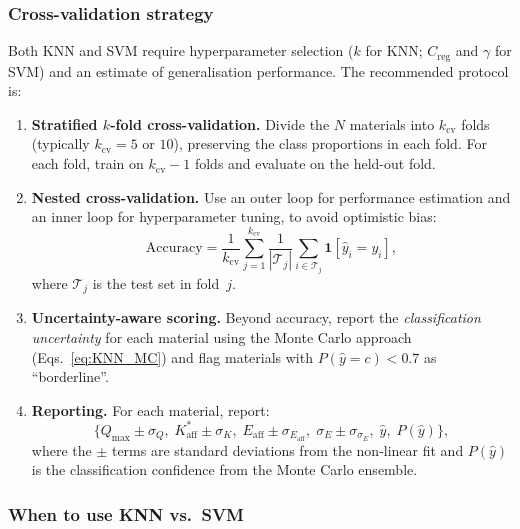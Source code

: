 \documentclass[12pt]{article}
\begin{document}
	\subsubsection{Cross-validation strategy}

	Both KNN and SVM require hyperparameter selection ($k$ for KNN;
	$C_{\mathrm{reg}}$ and $\gamma$ for SVM) and an estimate of
	generalisation performance.  The recommended protocol is:

	\begin{enumerate}
		\item \textbf{Stratified $k$-fold cross-validation.}
		Divide the $N$ materials into $k_{\mathrm{cv}}$ folds
		(typically $k_{\mathrm{cv}} = 5$ or $10$), preserving the
		class proportions in each fold.  For each fold,
		train on $k_{\mathrm{cv}}-1$ folds and evaluate on the
		held-out fold.

		\item \textbf{Nested cross-validation.}
		Use an outer loop for performance estimation and an inner
		loop for hyperparameter tuning, to avoid optimistic bias:
		\begin{equation}
			\text{Accuracy}
			= \frac{1}{k_{\mathrm{cv}}}
			\sum_{j=1}^{k_{\mathrm{cv}}}
			\frac{1}{|\mathcal{T}_j|}
			\sum_{i \in \mathcal{T}_j}
			\mathbf{1}[\hat{y}_i = y_i],
		\end{equation}
		where $\mathcal{T}_j$ is the test set in fold~$j$.

		\item \textbf{Uncertainty-aware scoring.}
		Beyond accuracy, report the \emph{classification
		uncertainty} for each material using the Monte Carlo
		approach (Eqs.~\eqref{eq:KNN_MC}) and flag materials
		with $P(\hat{y} = c) < 0.7$ as ``borderline''.

		\item \textbf{Reporting.}
		For each material, report:
		\begin{equation}
			\bigl\{
			Q_{\max} \pm \sigma_{Q},\;
			K_{\mathrm{aff}}^{\ast} \pm \sigma_{K},\;
			E_{\mathrm{aff}} \pm \sigma_{E_{\mathrm{aff}}},\;
			\sigma_E \pm \sigma_{\sigma_E},\;
			\hat{y},\;
			P(\hat{y})
			\bigr\},
		\end{equation}
		where the $\pm$ terms are standard deviations from the
		non-linear fit and $P(\hat{y})$ is the classification
		confidence from the Monte Carlo ensemble.
	\end{enumerate}

	\subsubsection{When to use KNN vs.\ SVM}
\end{document}
